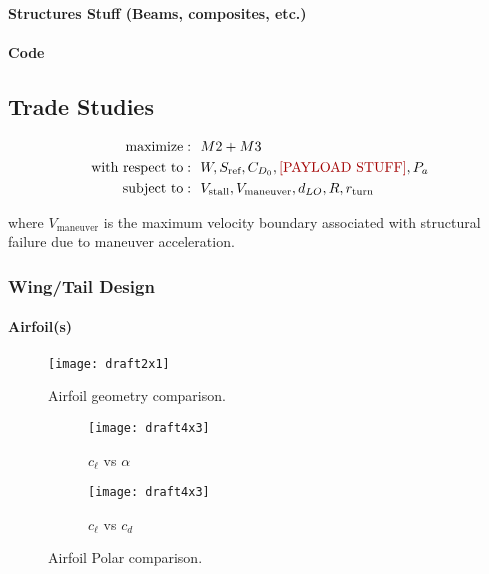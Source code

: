\paragraph{Structures Stuff (Beams, composites, etc.)}


\paragraph{Code}




\subsection{Trade Studies}
\label{ssec:tradestudies}

\begin{equation}
	\label{eqn:optdef}
	\begin{aligned}
		\text{maximize}: 
		& ~~M2 + M3 \\
		\text{with respect to}:
		& ~~W, S_\text{ref}, C_{D_0}, \text{\color{\BYUred} [PAYLOAD STUFF]}, P_a \\
		\text{subject to}: 
		& ~~V_\text{stall}, V_\text{maneuver}, d_{LO}, R, r_\text{turn}
	\end{aligned}
\end{equation}

where \(V_\text{maneuver}\) is the maximum velocity boundary associated with structural failure due to maneuver acceleration.


\subsubsection{Wing/Tail Design}

\paragraph{Airfoil(s)}

\begin{figure}[h!]
	\centering
	\texttt{[image: draft2x1]}
	\caption{Airfoil geometry comparison.}
	\label{fig:airfoilgeometrycomp}
\end{figure}

\begin{figure}[h!]
	\centering
	\begin{subfigure}[b]{0.475\textwidth}
		\texttt{[image: draft4x3]}
		\caption{\(c_\ell\) vs \(\alpha\)}
		\label{fig:clva}
	\end{subfigure}
	\begin{subfigure}[b]{0.475\textwidth}
		\texttt{[image: draft4x3]}
		\caption{\(c_\ell\) vs \(c_d\)}
		\label{fig:clvcd}
	\end{subfigure}
	\caption{Airfoil Polar comparison.}
	\label{fig:airfoilpolarcomp}
\end{figure}




